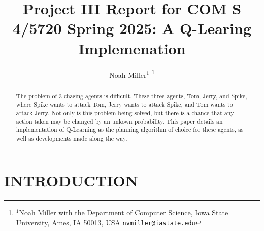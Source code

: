 \documentclass[letterpaper, 10 pt, conference]{ieeeconf}   %
\title{\LARGE \bf
Project III Report for COM S 4/5720 Spring 2025: A Q-Learing Implemenation
}
\author{Noah Miller$^{1}$%
\thanks{$^{1}$Noah Miller with the Department of Computer Science, Iowa State University,
        Ames, IA 50013, USA
        {\tt\small nvmiller@iastate.edu}}%
}
\begin{document}
\maketitle
\thispagestyle{empty}
\pagestyle{empty}


\begin{abstract}

	The problem of 3 chasing agents is difficult. These three agents, Tom, Jerry, and Spike, where Spike wants to attack Tom, Jerry wants to attack Spike, and Tom wants to attack Jerry.
	Not only is this problem being solved, but there is a chance that any action taken may be changed by an unkown probability.
	This paper details an implementation of Q-Learning as the planning algorithm of choice for these agents, as well as developments made along the way.

\end{abstract}




\section{INTRODUCTION}
\end{document}
